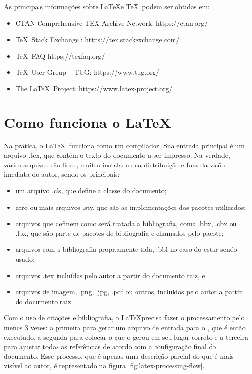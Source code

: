     
As principais informações sobre \LaTeX e \TeX\  podem ser obtidas em:
    \begin{itemize}
    \item CTAN Comprehensive TEX Archive Network: https://ctan.org/
    \item \TeX\ Stack Exchange :  https://tex.stackexchange.com/
    \item \TeX\ FAQ https://texfaq.org/
    \item \TeX\ User Group – TUG: https://www.tug.org/
    \item The \LaTeX\ Project: https://www.latex-project.org/
\end{itemize}


\section{Como funciona o \LaTeX}

Na prática, o \LaTeX\ funciona como um compilador. Sua entrada principal é um arquivo .tex, que contém o texto do documento a ser impresso. Na verdade, vários arquivos são lidos, muitos instalados na distribuição e fora da visão imediata do autor, sendo os principais:
\begin{itemize}
    \item um arquivo .cls, que define a classe do documento;
    \item zero ou mais arquivos .sty, que são as implementações dos pacotes utilizados;
    \item arquivos que definem como será tratada a bibliografia, como 
    .bbx, .cbx ou .lbx, que são parte de pacotes de bibliografia e chamados
    pelo pacote;
    \item arquivos com a bibliografia propriamente tida, .bbl no caso do  estar sendo usado;
    \item arquivos .tex incluídos pelo autor a partir do documento raiz, e
    \item arquivos de imagem, .png, .jpg, .pdf ou outros, incluídos pelo autor a partir do documento raiz.
\end{itemize}

Com o uso de citações e bibliografia, o \LaTeX  precisa fazer o processamento pelo menos 3 vezes: a primeira para gerar um arquivo de entrada para o , que é então executado, a segunda para colocar o que o  gerou em seu lugar correto e a terceira para ajustar todas as referências de acordo com a configuração final do documento. Esse processo, que é apenas uma descrição parcial do que é mais visível ao autor, é representado na figura \ref{fig:latex-processing-flow}.

